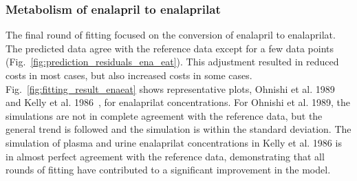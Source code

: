 \documentclass[pharmaceutics,article,submit,pdftex,moreauthors]{Definitions/mdpi}
\begin{document}
\subsubsection{Metabolism of enalapril to enalaprilat}


The final round of fitting focused on the conversion of enalapril to enalaprilat. The predicted data agree with the reference data except for a few data points (Fig.~\ref{fig:prediction_residuals_ena_eat}). This adjustment resulted in reduced costs in most cases, but also increased costs in some cases. Fig.~\ref{fig:fitting_result_enaeat} shows representative plots, Ohnishi et al. 1989~\cite{Ohnishi1989} and Kelly et al. 1986~\cite{Kelly1986}, for enalaprilat concentrations. For Ohnishi et al. 1989, the simulations are not in complete agreement with the reference data, but the general trend is followed and the simulation is within the standard deviation. The simulation of plasma and urine enalaprilat concentrations in Kelly et al. 1986 is in almost perfect agreement with the reference data, demonstrating that all rounds of fitting have contributed to a significant improvement in the model. 

\end{document}
